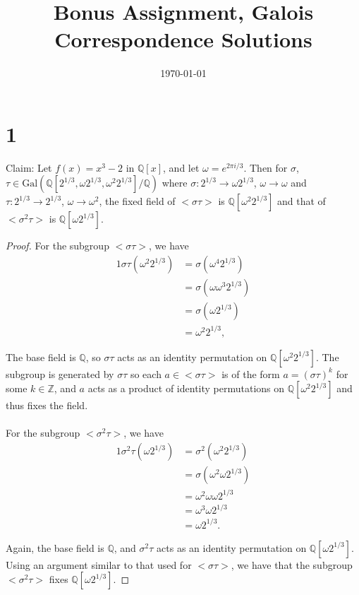 \documentclass{article}
\title{\textbf{Bonus Assignment, Galois Correspondence Solutions}}
\date{}
\date\today
\begin{document}
\maketitle %

\thispagestyle{firstpage}

\section*{1}

Claim: Let $f(x) = x^3 - 2$ in $\mathbb{Q}[x]$, and let $\omega = e^{2 \pi i /3}$.  Then 
for $\sigma$, $\tau \in \mathrm{Gal}(\mathbb{Q}[2^{1/3}, \omega 2^{1/3}, \omega^2 2^{1/3}] / \mathbb{Q})$ 
where $\sigma: 2^{1/3} \rightarrow \omega 2^{1/3}$, $\omega \rightarrow \omega$ and 
$\tau: 2^{1/3} \rightarrow 2^{1/3}$, $\omega \rightarrow \omega^2$, the fixed 
field of $< \sigma \tau >$ is $\mathbb{Q}[\omega ^2 2^{1/3}]$ and that of 
$< \sigma ^2 \tau >$ is $\mathbb{Q}[\omega 2^{1/3}]$.

\begin{proof}
  For the subgroup $< \sigma \tau >$, we have 
  \begin{alignat*}{1} 
    \sigma \tau (\omega ^2 2^{1/3}) &= \sigma (\omega ^4 2^{1/3}) \\ 
    &= \sigma (\omega \omega ^3 2^{1/3}) \\ 
    &= \sigma (\omega 2^{1/3}) \\ 
    &= \omega ^2 2^{1/3},
  \end{alignat*}

  The base field is $\mathbb{Q}$, so $\sigma \tau$ acts as an identity permutation on 
  $\mathbb{Q}[\omega^2 2^{1/3}]$.  The subgroup is generated by $\sigma \tau$ so 
  each $a \in < \sigma \tau >$ is of the form $a = (\sigma \tau)^k$ for some 
  $k \in \mathbb{Z}$, and $a$ acts as a product of identity permutations on 
  $\mathbb{Q}[\omega^2 2^{1/3}]$ and thus fixes the field. \\ 
  \\ 
  For the subgroup $< \sigma^2 \tau >$, we have 
  \begin{alignat*}{1} 
    \sigma^2 \tau (\omega 2^{1/3}) &= \sigma^2 (\omega^2 2^{1/3}) \\ 
    &= \sigma (\omega^2 \omega 2^{1/3}) \\ 
    &= \omega ^2 \omega \omega 2^{1/3} \\ 
    &= \omega ^3 \omega 2^{1/3} \\ 
    &= \omega 2^{1/3}.
  \end{alignat*}

Again, the base field is $\mathbb{Q}$, and $\sigma^2 \tau$ acts as an identity 
permutation on $\mathbb{Q}[\omega 2^{1/3}]$.  Using an argument similar to that 
used for $<\sigma \tau>$, we have that the subgroup $<\sigma^2 \tau>$ fixes
$\mathbb{Q}[\omega 2^{1/3}]$.
\end{proof}
\newpage
\end{document}
